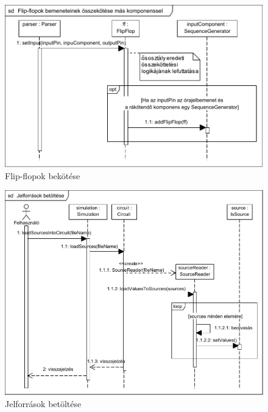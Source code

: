 \begin{figure}[H]
\begin{center}
\includegraphics{chapters/chapter04/seqdiagrams/ff_bekotese.pdf}
\caption{Flip-flopok bekötése}
\label{fig:FF_connect}
\end{center}
\end{figure}

\begin{figure}[H]
\begin{center}
\includegraphics{chapters/chapter04/seqdiagrams/jelforrasok_betoltese.pdf}
\caption{Jelforrások betöltése}
\label{fig:jelforrasok_betoltese}
\end{center}
\end{figure}


